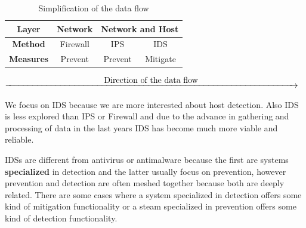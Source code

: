 \begin{table}[H]
	\centering
	\caption{Simplification of the data flow}
\linej
	\begin{tabular}{|c|c|c|c|}
	\hline
		\textbf{Layer} & Network & \multicolumn{2}{c|}{Network and Host}\\ \hline
		\textbf{Method} & Firewall & IPS & IDS\\ \hline
		\textbf{Measures} & Prevent & Prevent & Mitigate\\ \hline
	\end{tabular}
\end{table}
$\xrightarrow{\makebox[\textwidth]{Direction of the data flow}}$


\linej
\linej
We focus on IDS because we are more interested about host detection. Also IDS is less explored than IPS or Firewall and due to the advance in gathering and processing of data in the last years IDS has become much more viable and reliable.

\linej
\linej
IDSs are different from antivirus or antimalware because the first are systems \textbf{specialized} in detection and the latter usually focus on prevention, however prevention and detection are often meshed together because both are deeply related. There are some cases where a system specialized in detection offers some kind of mitigation functionality or a steam specialized in prevention offers some kind of detection functionality.

